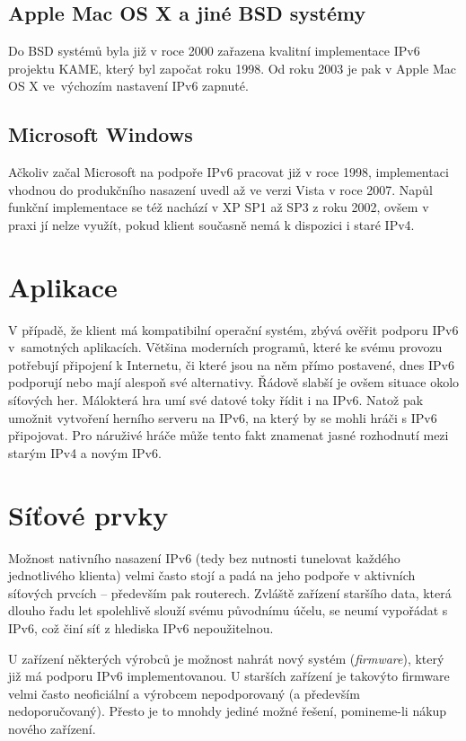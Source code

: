 \documentclass[12pt]{report}
\begin{document}
\subsection{Apple Mac OS X a jiné BSD systémy}
Do BSD systémů byla již v roce 2000 zařazena kvalitní implementace IPv6 projektu KAME, který byl započat roku 1998. Od roku 2003 je pak v Apple Mac OS X ve~výchozím nastavení IPv6 zapnuté.

\subsection{Microsoft Windows}
Ačkoliv začal Microsoft na podpoře IPv6 pracovat již v roce 1998, implementaci vhodnou do produkčního nasazení uvedl až ve verzi Vista v roce 2007. Napůl funkční implementace se též nachází v XP SP1 až SP3 z roku 2002, ovšem v praxi jí nelze využít, pokud klient současně nemá k dispozici i staré IPv4.

\section{Aplikace}
V případě, že klient má kompatibilní operační systém, zbývá ověřit podporu IPv6 v~samotných aplikacích. Většina moderních programů, které ke svému provozu potřebují připojení k Internetu, či které jsou na něm přímo postavené, dnes IPv6 podporují nebo mají alespoň své alternativy. Řádově slabší je ovšem situace okolo síťových her. Málokterá hra umí své datové toky řídit i na IPv6. Natož pak umožnit vytvoření herního serveru na IPv6, na který by se mohli hráči s IPv6 připojovat. Pro náruživé hráče může tento fakt znamenat jasné rozhodnutí mezi starým IPv4 a novým IPv6.

\section{Síťové prvky}
Možnost nativního nasazení IPv6 (tedy bez nutnosti tunelovat každého jednotlivého klienta) velmi často stojí a padá na jeho podpoře v aktivních síťových prvcích -- především pak routerech. Zvláště zařízení staršího data, která dlouho řadu let spolehlivě slouží svému původnímu účelu, se neumí vypořádat s IPv6, což činí síť z hlediska IPv6 nepoužitelnou.

U zařízení některých výrobců je možnost nahrát nový systém (\textit{firmware}), který již má podporu IPv6 implementovanou. U starších zařízení je takovýto firmware velmi často neoficiální a výrobcem nepodporovaný (a především nedoporučovaný). Přesto je to mnohdy jediné možné řešení, pomineme-li nákup nového zařízení.
\newpage{}
\end{document}
